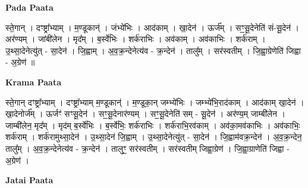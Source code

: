 \documentclass[17pt]{extarticle}
\begin{document}
\textbf{Pada Paata} \newline

स्ते॒गान् । दꣳष्ट्रा᳚भ्याम् । म॒ण्डूकान्॑ । जंभ्ये॑भिः । आद॑काम् । खा॒देन॑ । ऊर्ज᳚म् । सꣳ॒॒सू॒देनेति॑ सं-सू॒देन॑ । अर॑ण्यम् । जांबी॑लेन । मृद᳚म् । ब॒र्स्वे॑भिः । शर्क॑राभिः । अव॑काम् । अव॑काभिः । शर्क॑राम् । उ॒थ्सा॒देनेत्यु॑त् - सा॒देन॑ । जि॒ह्वाम् । अ॒व॒क्र॒न्देनेत्य॑व - क्र॒न्देन॑ । तालु᳚म् । सर॑स्वतीम् । जि॒ह्वा॒ग्रेणेति॑ जिह्वा - अ॒ग्रेण॑ ॥  \newline


\textbf{Krama Paata} \newline

स्ते॒गान् दꣳष्ट्रा᳚भ्याम् । दꣳष्ट्रा᳚भ्याम् म॒ण्डूकान्॑ । म॒ण्डूका॒न् जम्भ्ये॑भिः । जम्भ्ये॑भि॒राद॑काम् । आद॑काम् खा॒देन॑ । खा॒देनोर्ज᳚म् । ऊर्जꣳ॑ सꣳसू॒देन॑ । सꣳ॒॒सू॒देनार॑ण्यम् । सꣳ॒॒सू॒देनेति॑ सम् - सू॒देन॑ । अर॑ण्य॒म् जाम्बी॑लेन । जाम्बी॑लेन॒ मृद᳚म् । मृद॑म् ब॒र्स्वे॑भिः । ब॒र्स्वे॑भिः॒ शर्क॑राभिः । शर्क॑राभि॒रव॑काम् । अव॑का॒मव॑काभिः । अव॑काभिः॒ शर्क॑राम् । शर्क॑रामुथ्सा॒देन॑ । उ॒थ्सा॒देन॑ जि॒ह्वाम् । उ॒थ्सा॒देनेत्यु॑त् - सा॒देन॑ । जि॒ह्वाम॑वक्र॒न्देन॑ । अ॒व॒क्र॒न्देन॒ तालु᳚म् । अ॒व॒क्र॒न्देनेत्य॑व - क्र॒न्देन॑ । तालुꣳ॒॒ सर॑स्वतीम् । सर॑स्वतीम् जिह्वा॒ग्रेण॑ । जि॒ह्वा॒ग्राणेति॑ जिह्वा - अ॒ग्रेण॑ । \newline

\textbf{Jatai Paata} \newline
\end{document}
